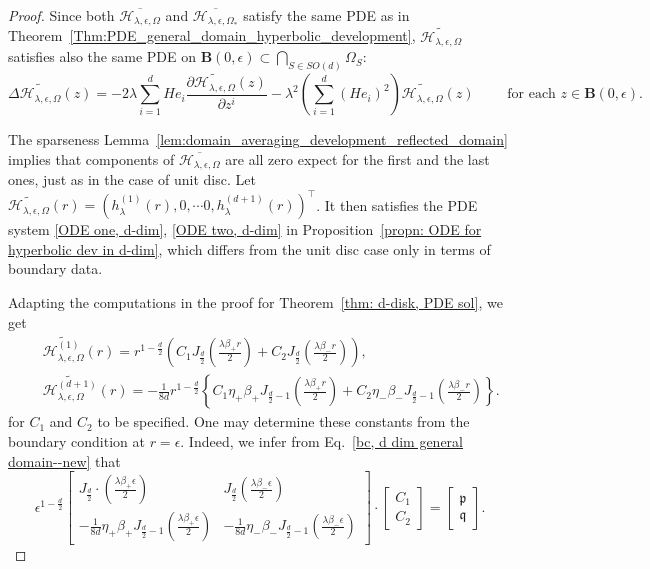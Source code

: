 \documentclass[11pt,a4paper,english,reqno]{amsart}
\theoremstyle{plain}
\newcommand{\e}{\epsilon}
\newcommand{\1}{\mathbbm{1}}
\begin{document}
\begin{proof}
Since both $\overline{\mathcal{H}_{\lambda, \e, \Omega}}$ and $\overline{\mathcal{H}_{\lambda, \e, \Omega_\ast}}$ satisfy the same PDE as in Theorem~\ref{Thm:PDE_general_domain_hyperbolic_development}, $\widetilde{\mathcal{H}_{\lambda,\e,\Omega}}$ satisfies also the same PDE on  $\mathbf{B}(0,\e) \subset \bigcap_{S \in SO(d)} \Omega_S$:
\begin{equation*}
\Delta \widetilde{\mathcal{H}_{\lambda,\e, \Omega}}(z)=-2\lambda\sum_{i=1}^{d}He_{i}\frac{\partial \widetilde{\mathcal{H}_{\lambda,\e,\Omega}}(z)}{\partial z^{i}}-\lambda^{2}\left(\sum_{i=1}^{d}\left(He_{i}\right)^{2}\right)\widetilde{\mathcal{H}_{\lambda,\e,\Omega}}(z)\qquad \text{ for each } z \in \mathbf{B}(0,\e).
\end{equation*}

The sparseness Lemma~\ref{lem:domain_averaging_development_reflected_domain} implies that components of $\overline{\mathcal{H}_{\lambda,\e,\Omega}}$ are all zero expect for the first and the last ones, just as in the case of unit disc. Let $\widetilde{\mathcal{H}_{\lambda,\e,\Omega}}(r) = \left(h^{(1)}_\lambda(r), 0, \cdots 0, h^{(d+1)}_\lambda(r)\right)^\top$. It then satisfies the PDE system \eqref{ODE one, d-dim},  \eqref{ODE two, d-dim} in Proposition~\ref{propn: ODE for hyperbolic dev in d-dim}, which differs from the unit disc case only in terms of boundary data.  


Adapting the computations in the proof for Theorem~\ref{thm: d-disk, PDE sol}, we get
\begin{eqnarray*}
&&\widetilde{\mathcal{H}^{(1)}_{\lambda,\e, \Omega}}(r) = r^{1-\frac{d}{2}  }\left(C_{1} J_{\frac{d}{2}}\left( \frac{\lambda  \beta_+ r}{2}\right) +  C_{2}J_{\frac{d}{2}}\left( \frac{\lambda \beta_- r}{2}\right)\right),\\
&&\widetilde{\mathcal{H}^{(d+1)}_{\lambda,\e, \Omega}}(r) = - \frac{1}{8d}r^{1-\frac{d}{2}  }\left\{C_1 \eta_+ \beta_+  J_{\frac{d}{2}-1} \left( \frac{\lambda \beta_+ r}{2}\right) + C_2 \eta_-\beta_-  J_{\frac{d}{2}-1}\left( \frac{\lambda \beta_- r}{2}\right)\right\}. 
\end{eqnarray*}
for $C_1$ and $C_2$ to be specified. One may determine these constants from the boundary condition at $r=\e$. Indeed, we infer from Eq.~\eqref{bc, d dim general domain--new} that
\begin{equation}
\e^{1-\frac{d}{2}}
\begin{bmatrix}
J_{\frac{d}{2}}\cdot\left( \frac{\lambda  \beta_+ \e}{2}\right) & J_{\frac{d}{2}}\left( \frac{\lambda  \beta_- \e}{2}\right)\\
-\frac{1}{8d}\eta_+ \beta_{+}   J_{\frac{d}{2}-1} \left( \frac{\lambda \beta_+ \e}{2}\right) & -\frac{1}{8d}\eta_- \beta_- J_{\frac{d}{2}-1} \left( \frac{\lambda \beta_- \e}{2}\right)
\end{bmatrix}\cdot\begin{bmatrix}
C_1\\
C_2
\end{bmatrix} = \begin{bmatrix}
\mathfrak{p}\\
\mathfrak{q}
\end{bmatrix}.
\end{equation}



\end{proof}
\end{document}
